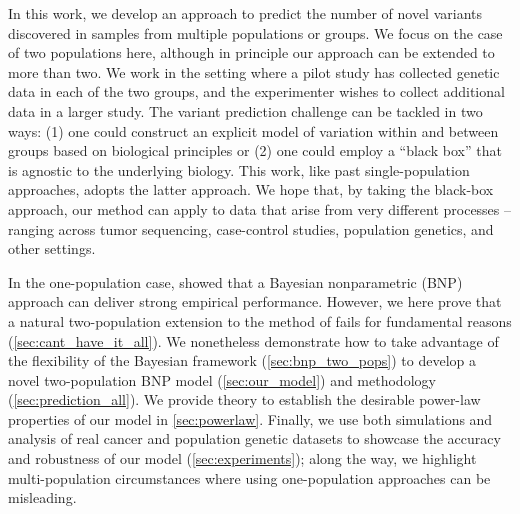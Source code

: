 In this work, we develop an approach to predict the number of novel variants discovered in samples from multiple populations or groups. We focus on the case of two populations here, although in principle our approach can be extended to more than two. We work in the setting where a pilot study has collected genetic data in each of the two groups, and the experimenter wishes to collect additional data in a larger study.
The variant prediction challenge can be tackled in two ways: (1) one could construct an explicit model of variation within and between groups based on biological principles or (2) one could employ a ``black box'' that is agnostic to the underlying biology. This work, like past single-population approaches, adopts the latter approach. We hope that, by taking the black-box approach, our method can apply to data that arise from very different processes -- ranging across tumor sequencing, case-control studies, population genetics, and other settings. 

In the one-population case, \citet{Masoero2022} showed that a Bayesian nonparametric (BNP) approach can deliver strong empirical performance. 
However, we here prove that a natural two-population extension to the method of \citet{Masoero2022} fails for fundamental reasons (\cref{sec:cant_have_it_all}). We nonetheless demonstrate how to take advantage of the flexibility of the Bayesian framework (\cref{sec:bnp_two_pops}) to develop a novel two-population BNP model (\cref{sec:our_model}) and methodology (\cref{sec:prediction_all}). We provide theory to establish the desirable power-law properties of our model in \cref{sec:powerlaw}. Finally, we use both simulations and analysis of real cancer and population genetic datasets to showcase the accuracy and robustness of our model (\cref{sec:experiments}); along the way, we highlight multi-population circumstances where using one-population approaches can be misleading.


